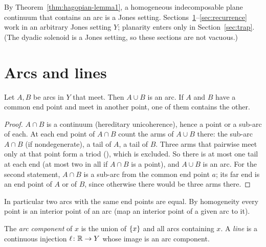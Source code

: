 
By Theorem~\ref{thm:hagopian-lemma1}, a homogeneous indecomposable plane continuum that contains an arc is a Jones
setting. Sections~\ref{sec:lines}--\ref{sec:recurrence} work in an arbitrary Jones setting $Y$; planarity enters
only in Section~\ref{sec:trap}. (The dyadic solenoid is a Jones setting, so these sections are not vacuous.)

\section{Arcs and lines}\label{sec:lines}

\begin{proposition}[Jones (c)]\label{prop:jones-c}
Let $A,B$ be arcs in $Y$ that meet. Then $A\cup B$ is an arc. If $A$ and $B$ have a common end point and meet in another
point, one of them contains the other.
\end{proposition}

\begin{proof}
$A\cap B$ is a continuum (hereditary unicoherence), hence a point or a sub-arc of each. At each end point of $A\cap B$
count the arms of $A\cup B$ there: the sub-arc $A\cap B$ (if nondegenerate), a tail of $A$, a tail of $B$. Three arms that
pairwise meet only at that point form a triod (), which is excluded. So there is at most one tail at
each end (at most two in all if $A\cap B$ is a point), and $A\cup B$ is an arc. For the second statement, $A\cap B$ is a sub-arc
from the common end point $a$; its far end is an end point of $A$ or of $B$, since otherwise there would be three arms
there.
\end{proof}


In particular two arcs with the same end points are equal. By homogeneity every point is an interior point of an arc
(map an interior point of a given arc to it).


The \emph{arc component} of $x$ is the union of $\left\{ x \right\}$ and all arcs containing $x$. A \emph{line} is a continuous
injection $\ell\colon\mathbb{R}\to Y$ whose image is an arc component.

